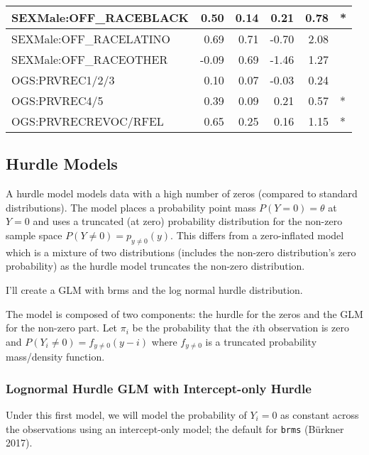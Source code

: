 \documentclass[
  letterpaper,
  DIV=11,
  numbers=noendperiod]{scrartcl}
\begin{document}
\begin{table}
\begin{tabular}{l|r|r|r|r|l}
\hline
SEXMale:OFF\_RACEBLACK & 0.50 & 0.14 & 0.21 & 0.78 & *\\
\hline
SEXMale:OFF\_RACELATINO & 0.69 & 0.71 & -0.70 & 2.08 & \\
\hline
SEXMale:OFF\_RACEOTHER & -0.09 & 0.69 & -1.46 & 1.27 & \\
\hline
OGS:PRVREC1/2/3 & 0.10 & 0.07 & -0.03 & 0.24 & \\
\hline
OGS:PRVREC4/5 & 0.39 & 0.09 & 0.21 & 0.57 & *\\
\hline
OGS:PRVRECREVOC/RFEL & 0.65 & 0.25 & 0.16 & 1.15 & *\\
\hline
\end{tabular}
\end{table}

\hypertarget{hurdle-models}{%
\subsection{Hurdle Models}\label{hurdle-models}}

A hurdle model models data with a high number of zeros (compared to
standard distributions). The model places a probability point mass
\(P(Y = 0) = \theta\) at \(Y = 0\) and uses a truncated (at zero)
probability distribution for the non-zero sample space
\(P(Y \neq 0) = p_{y \neq 0}(y)\). This differs from a zero-inflated
model which is a mixture of two distributions (includes the non-zero
distribution's zero probability) as the hurdle model truncates the
non-zero distribution.

I'll create a GLM with brms and the log normal hurdle distribution.

The model is composed of two components: the hurdle for the zeros and
the GLM for the non-zero part. Let \(\pi_i\) be the probability that the
\(i\)th observation is zero and \(P(Y_i \neq 0) = f_{y\neq 0}(y-i)\)
where \(f_{y\neq 0}\) is a truncated probability mass/density function.

\hypertarget{lognormal-hurdle-glm-with-intercept-only-hurdle}{%
\subsubsection{Lognormal Hurdle GLM with Intercept-only
Hurdle}\label{lognormal-hurdle-glm-with-intercept-only-hurdle}}

Under this first model, we will model the probability of \(Y_i = 0\) as
constant across the observations using an intercept-only model; the
default for \texttt{brms} (Bürkner 2017).
\end{document}

